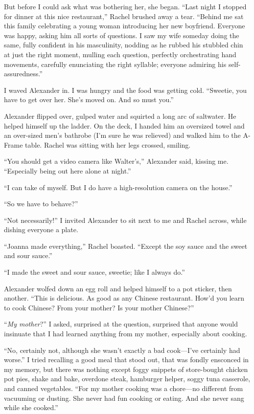 But before I could ask what was bothering her, she began. ``Last night I
stopped for dinner at this nice restaurant,'' Rachel brushed away a
tear. ``Behind me sat this family celebrating a young woman introducing
her new boyfriend. Everyone was happy, asking him all sorts of
questions. I saw my wife someday doing the same, fully confident in his
masculinity, nodding as he rubbed his stubbled chin at just the right
moment, mulling each question, perfectly orchestrating hand movements,
carefully enunciating the right syllable; everyone admiring his
self-assuredness.''

I waved Alexander in. I was hungry and the food was getting cold.
``Sweetie, you have to get over her. She's moved on. And so must you.''

Alexander flipped over, gulped water and squirted a long arc of
saltwater. He helped himself up the ladder. On the deck, I handed him an
oversized towel and an over-sized men's bathrobe (I'm sure he was
relieved) and walked him to the A-Frame table. Rachel was sitting with
her legs crossed, smiling.

``You should get a video camera like Walter's,'' Alexander said, kissing
me. ``Especially being out here alone at night.''

``I can take of myself. But I do have a high-resolution camera on the
house.''

``So we have to behave?''

``Not necessarily!'' I invited Alexander to sit next to me and Rachel
across, while dishing everyone a plate.

``Joanna made everything,'' Rachel boasted. ``Except the soy sauce and
the sweet and sour sauce.''

``I made the sweet and sour sauce, sweetie; like I always do.''

Alexander wolfed down an egg roll and helped himself to a pot sticker,
then another. ``This is delicious. As good as any Chinese restaurant.
How'd you learn to cook Chinese? From your mother? Is your mother
Chinese?''

``\emph{My mother}?'' I asked, surprised at the question, surprised that
anyone would insinuate that I had learned anything from my mother,
especially about cooking.

``No, certainly not, although she wasn't exactly a bad cook---I've
certainly had worse.'' I tried recalling a good meal that stood out,
that was fondly ensconced in my memory, but there was nothing except
foggy snippets of store-bought chicken pot pies, shake and bake,
overdone steak, hamburger helper, soggy tuna casserole, and canned
vegetables. ``For my mother cooking was a chore---no different from
vacuuming or dusting. She never had fun cooking or eating. And she never
sang while she cooked.''

